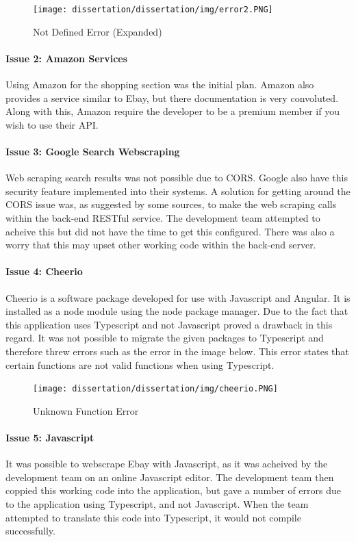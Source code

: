 \begin{figure}[H]
    \centering
    \texttt{[image: dissertation/dissertation/img/error2.PNG]}
    \caption{Not Defined Error (Expanded)}
    \label{fig:errorExplained}
\end{figure}

\paragraph{Issue 2: Amazon Services}
Using Amazon for the shopping section was the initial plan. Amazon also provides a service similar to Ebay, but there documentation is very convoluted. Along with this, Amazon require the developer to be a premium member if you wish to use their API.
\paragraph{Issue 3: Google Search Webscraping}
Web scraping search results was not possible due to CORS. Google also have this security feature implemented into their systems. A solution for getting around the CORS issue was, as suggested by some sources, to make the web scraping calls within the back-end RESTful service. The development team attempted to acheive this but did not have the time to get this configured. There was also a worry that this may upset other working code within the back-end server.
\paragraph{Issue 4: Cheerio}
Cheerio is a software package developed for use with Javascript and Angular. It is installed as a node module using the node package manager. Due to the fact that this application uses Typescript and not Javascript proved a drawback in this regard. It was not possible to migrate the given packages to Typescript and therefore threw errors such as the error in the image below. This error states that certain functions are not valid functions when using Typescript.
\begin{figure}[H]
    \centering
    \texttt{[image: dissertation/dissertation/img/cheerio.PNG]}
    \caption{Unknown Function Error}
    \label{fig:my_label}
\end{figure}

\paragraph{Issue 5: Javascript}
It was possible to webscrape Ebay with Javascript, as it was acheived by the development team on an online Javascript editor. The development team then coppied this working code into the application, but gave a number of errors due to the application using Typescript, and not Javascript. When the team attempted to translate this code into Typescript, it would not compile successfully.

